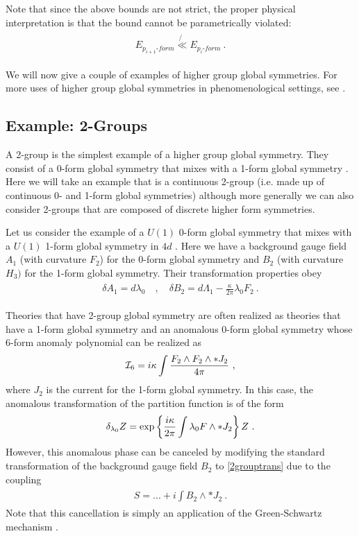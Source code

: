 \documentclass[11pt]{article}
\newcommand{\eq}[1]{\begin{align}\begin{split}#1\end{split}\end{align}}
\newcommand{\twopi}[1]{{\frac{#1}{2\pi}}}
\def\exp{{\rm exp}}
\def\CI {{\cal I}}
\def\CI {{{\cal I}}}
\begin{document}
Note that since the above bounds are not strict, the proper physical interpretation is that the bound cannot be parametrically violated:
\eq{
 E_{p_{i+1}\text{-}form}\not{\ll}E_{p_{i}\text{-}form}~.
}

We will now give a couple of examples of higher group global symmetries. For more uses of higher group global symmetries in phenomenological settings, see \cite{Cordova:2022qtz,Hidaka:2020iaz,Hidaka:2020izy,Brennan:2020ehu,Brennan:2023kpw}. 


\subsection{Example: 2-Groups}

A 2-group is the simplest example  of a higher group global symmetry. They consist of a 0-form global symmetry that mixes with a 1-form global symmetry \cite{Baez:2004in,Baez:2010ya,Gukov:2013zka,Kapustin:2013uxa,Cordova:2018cvg,Benini:2018reh}. Here we will take an example that is a continuous 2-group (i.e. made up of continuous 0- and 1-form global symmetries) although more generally we can also consider 2-groups that are composed of discrete higher form symmetries. 

Let us consider the example of a $U(1)$ 0-form global symmetry that mixes with a $U(1)$ 1-form global symmetry in $4d$ . Here we have a background gauge field $A_1$ (with curvature $F_2$) for the 0-form global symmetry and $B_2$ (with curvature $H_3)$ for the 1-form global symmetry. Their transformation properties obey 
\eq{\label{2grouptrans}
\delta A_1=d\lambda_0\quad, \quad \delta B_2=d\Lambda_1-\twopi{\kappa} \lambda_0 F_2~. 
}

Theories that have 2-group global symmetry are often realized as theories that have a 1-form global symmetry and an anomalous 0-form global symmetry whose 6-form anomaly polynomial can be realized as 
\eq{
\CI_6=i\kappa \int \frac{F_2\wedge F_2\wedge \ast J_2}{4\pi}~, 
}
where $J_2$ is the current for the 1-form global symmetry. In this case, the anomalous transformation of the partition function is of the form 
\eq{
\delta_{\lambda_0}Z=\exp\left\{\twopi{i\kappa }\int \lambda_0 F\wedge  \ast J_2\right\}Z~. 
}
However, this anomalous phase can be canceled by modifying the standard transformation of the background gauge field $B_2$ to \eqref{2grouptrans} due to the coupling 
\eq{
S=...+i \int B_2\wedge  \ast J_2~.
}
Note that this cancellation is simply an application of the Green-Schwartz mechanism \cite{Green:1984sg}.
\end{document}
